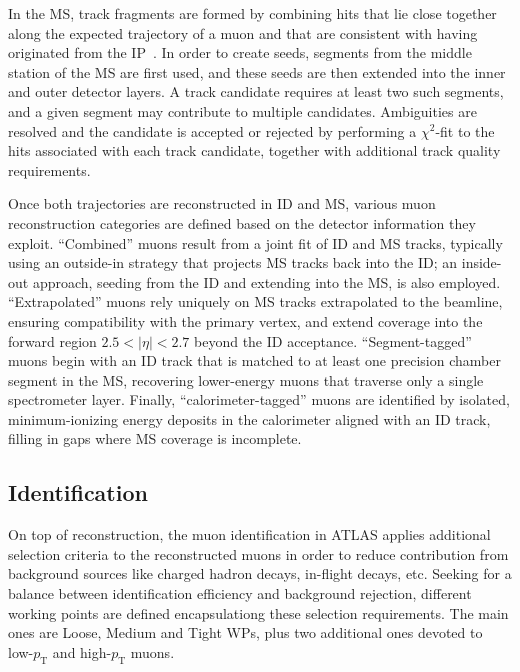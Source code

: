 In the MS, track fragments are formed by combining hits that lie close together along the expected trajectory of a muon and that are consistent with having originated from the IP~\cite{muon_reco_run2}. 
In order to create seeds, segments from the middle station of the MS are first used, and these seeds are then extended into the inner and outer detector layers. A track candidate requires at least two such segments, and a given segment may contribute to multiple candidates. Ambiguities are resolved and the candidate is accepted or rejected by performing a $\chi^2$-fit to the hits associated with each track candidate, together with additional track quality requirements.

Once both trajectories are reconstructed in ID and MS, various muon reconstruction categories are defined based on the detector information they exploit. “Combined” muons result from a joint fit of ID and MS tracks, typically using an outside-in strategy that projects MS tracks back into the ID; an inside-out approach, seeding from the ID and extending into the MS, is also employed. “Extrapolated” muons rely uniquely on MS tracks extrapolated to the beamline, ensuring compatibility with the primary vertex, and extend coverage into the forward region $2.5 < |\eta| < 2.7$
beyond the ID acceptance. “Segment-tagged” muons begin with an ID track that is matched to at least one precision chamber segment in the MS, recovering lower-energy muons that traverse only a single spectrometer layer. Finally, “calorimeter-tagged” muons are identified by isolated, minimum-ionizing energy deposits in the calorimeter aligned with an ID track, filling in gaps where MS coverage is incomplete.

\subsection*{Identification} 

On top of reconstruction, the muon identification in ATLAS applies additional selection criteria to the reconstructed muons in order to reduce contribution from background sources like charged hadron decays, in-flight decays, etc.
Seeking for a balance between identification efficiency and background rejection, different working points are defined encapsulationg these selection requirements. The main ones are Loose, Medium and Tight WPs, plus two additional ones devoted to low-$p_{\text{T}}$ and high-$p_{\text{T}}$ muons.

